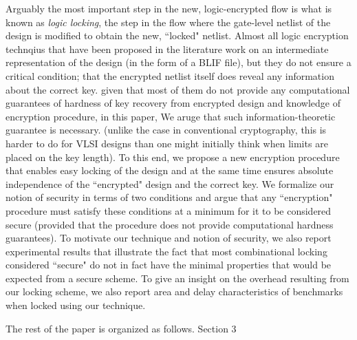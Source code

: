 Arguably the most important step in the new, logic-encrypted flow is what is known as \emph{logic locking}, the step in the flow where the gate-level netlist of the design is modified to obtain the new, ``locked" netlist. Almost all logic encryption technqius that have been proposed in the literature work on an intermediate representation of the design (in the form of a BLIF file), but they do not ensure a critical condition; that the encrypted netlist itself does reveal any information about the correct key. given that most of them do not provide any computational guarantees of hardness of key recovery from encrypted design and knowledge of encryption procedure, in this paper, We aruge that such information-theoretic guarantee is necessary. (unlike the case in conventional cryptography, this is harder to do for VLSI designs than one might initially think %
when limits are placed on the key length). To this end, we propose a new encryption procedure that enables easy locking of the design and at the same time ensures absolute independence of the ``encrypted" design and the correct key. We formalize our notion of security in terms of two conditions and argue that any ``encryption" procedure must satisfy these conditions at a minimum for it to be considered secure (provided that the procedure does not provide computational hardness guarantees). To motivate our technique and notion of security, we also report experimental results that illustrate the fact that most combinational locking considered ``secure" do not in fact have the minimal properties that would be expected from a secure scheme. To give an insight on the overhead resulting from our locking scheme, we also report area and delay characteristics of benchmarks when locked using our technique.

The rest of the paper is organized as follows. Section 3 
